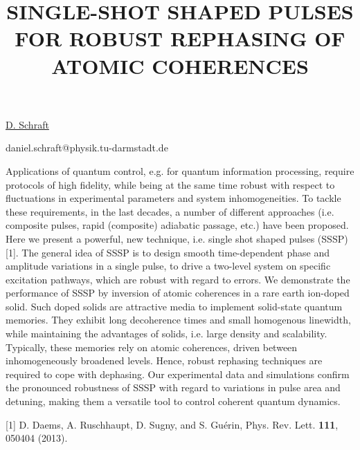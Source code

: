 \title{SINGLE-SHOT SHAPED PULSES FOR ROBUST REPHASING OF ATOMIC COHERENCES}

\underline{D. Schraft} 

{\normalsize{\vspace{-4mm}
\darmstadt

\email daniel.schraft@physik.tu-darmstadt.de}}

Applications of quantum control, e.g. for quantum information processing, require protocols of high fidelity, while being at the same time robust with respect to fluctuations in experimental parameters and system inhomogeneities. To tackle these requirements, in the last decades, a number of different approaches (i.e. composite pulses, rapid (composite) adiabatic passage, etc.) have been proposed. Here we present a powerful, new technique, i.e. single shot shaped pulses (SSSP) [1]. The general idea of SSSP is to design smooth time-dependent phase and amplitude variations in a single pulse, to drive a two-level system on specific excitation pathways, which are robust with regard to errors. We demonstrate the performance of SSSP by inversion of atomic coherences in a rare earth ion-doped solid. Such doped solids are attractive media to implement solid-state quantum memories. They exhibit long decoherence times and small homogenous linewidth, while maintaining the advantages of solids, i.e. large density and scalability. Typically, these memories rely on atomic coherences, driven between inhomogeneously broadened levels. Hence, robust rephasing techniques are required to cope with dephasing. Our experimental data and simulations confirm the pronounced robustness of SSSP with regard to variations in pulse area and detuning, making them a versatile tool to control coherent quantum dynamics.

{\normalsize
[1] D. Daems, A. Ruschhaupt, D. Sugny, and S. Gu\'erin, Phys. Rev. Lett. \textbf{111}, 050404 (2013).
}

\vspace{\baselineskip}
